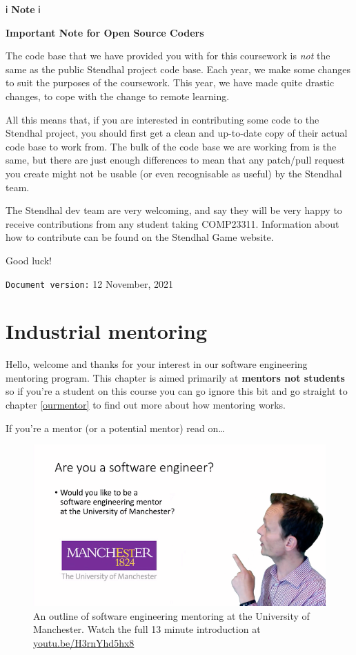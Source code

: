 \documentclass[
]{book}
\begin{document}
ℹ️ \textbf{Note} ℹ️

\textbf{Important Note for Open Source Coders}

The code base that we have provided you with for this coursework is \emph{not} the same as the public Stendhal project code base. Each year, we make some changes to suit the purposes of the coursework. This year, we have made quite drastic changes, to cope with the change to remote learning.

All this means that, if you are interested in contributing some code to the Stendhal project, you should first get a clean and up-to-date copy of their actual code base to work from. The bulk of the code base we are working from is the same, but there are just enough differences to mean that any patch/pull request you create might not be usable (or even recognisable as useful) by the Stendhal team.

The Stendhal dev team are very welcoming, and say they will be very happy to receive contributions from any student taking COMP23311. Information about how to contribute can be found on the Stendhal Game website.

Good luck!

\texttt{Document\ version:} 12 November, 2021

\hypertarget{mentoring}{%
\chapter{Industrial mentoring}\label{mentoring}}

Hello, welcome and thanks for your interest in our software engineering mentoring program. This chapter is aimed primarily at \textbf{mentors not students} so if you're a student on this course you can go ignore this bit and go straight to chapter \ref{ourmentor} to find out more about how mentoring works.

If you're a mentor (or a potential mentor) read on\ldots{}

\begin{figure}

{\centering \includegraphics[width=1\linewidth]{images/software-mentoring} 

}

\caption{An outline of software engineering mentoring at the University of Manchester. Watch the full 13 minute introduction at \href{https://youtu.be/H3rnYhd5hx8}{youtu.be/H3rnYhd5hx8}}\label{fig:mentoring-fig}
\end{figure}
\end{document}
